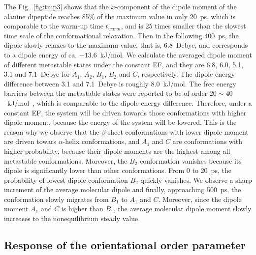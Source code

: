 \documentclass[a4paper,preprint,unsortedaddress,onecolumn]{revtex4-1}
\begin{document}
The Fig.~\ref{fig:tmp3}
shows that the $x$-component of the dipole moment of the alanine dipeptide
reaches 85\% of the maximum value in only 20~ps, which is comparable to
the warm-up time $t_{warm}$, and is 25 times
smaller than the slowest time scale of the conformational relaxation.
Then in the following 400~ps, the dipole slowly relaxes to the 
maximum value, that is, 
6.8~Debye, and  corresponds to a dipole energy of ca. $-13.6$~kJ/mol.
We calculate the averaged dipole moment of different metastable states
under the constant EF, and they are 6.8, 6.0, 5.1, 3.1 and 7.1~Debye
for $A_1$, $A_2$, $B_1$, $B_2$ and $C$, respectively.
The dipole energy difference between 3.1 and 7.1~Debye is roughly 8.0~kJ/mol.
The free energy barriers between the
metastable states were reported to be of order $20\sim 40$~kJ/mol~\cite{bohner2012algorithm},
which is comparable to the dipole energy difference. 
Therefore, under a constant EF, the system will be driven towards those
conformations with higher dipole moment, because the
energy of the system will be lowered.  This is the reason why
we observe that the $\beta$-sheet conformations with lower dipole moment
are driven towars $\alpha$-helix conformations, 
and $A_1$ and $C$ are conformations with higher probability, because their dipole moments are the highest
among all metastable conformations. Moreover, the $B_2$ conformation vanishes because
its dipole is significantly lower than other conformations.
From 0 to 20~ps, the probability of
lowest dipole conformation $B_2$ quickly
vanishes. We observe a sharp increment of the average molecular dipole and finally, approaching  500~ps, the conformation slowly migrates from
$B_1$ to $A_1$ and $C$. Moreover, since the dipole moment $A_1$ and $C$
is higher than $B_1$, the average molecular dipole moment slowly increases
to the nonequilibrium steady value.
\subsection{Response of the orientational order parameter}
\end{document}
